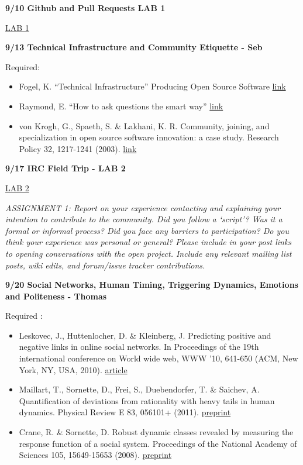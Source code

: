 \textbf{9/10 Github and Pull Requests LAB 1}

\href{http://courses.ischool.berkeley.edu/i290m-ocpp/site/article/lab1.html}{LAB
1}

\textbf{9/13 Technical Infrastructure and Community Etiquette - Seb}

Required:

\begin{itemize}
\itemsep1pt\parskip0pt
\item
  Fogel, K. ``Technical Infrastructure'' Producing Open Source Software
  \href{http://producingoss.com/en/technical-infrastructure.html}{link}
\item
  Raymond, E. ``How to ask questions the smart way''
  \href{http://www.catb.org/esr/faqs/smart-questions.html}{link}
\item
  von Krogh, G., Spaeth, S. \& Lakhani, K. R. Community, joining, and
  specialization in open source software innovation: a case study.
  Research Policy 32, 1217-1241 (2003).
  \href{http://flosshub.org/system/files/rp-vonkroghspaethlakhani.pdf}{link}
\end{itemize}

\textbf{9/17 IRC Field Trip - LAB 2}

\href{http://courses.ischool.berkeley.edu/i290m-ocpp/site/article/lab2.html}{LAB
2}

\emph{ASSIGNMENT 1: Report on your experience contacting and explaining
your intention to contribute to the community. Did you follow a
`script'? Was it a formal or informal process? Did you face any barriers
to participation? Do you think your experience was personal or general?
Please include in your post links to opening conversations with the open
project. Include any relevant mailing list posts, wiki edits, and
forum/issue tracker contributions.}

\textbf{9/20 Social Networks, Human Timing, Triggering Dynamics,
Emotions and Politeness - Thomas}

Required :

\begin{itemize}
\itemsep1pt\parskip0pt
\item
  Leskovec, J., Huttenlocher, D. \& Kleinberg, J. Predicting positive
  and negative links in online social networks. In Proceedings of the
  19th international conference on World wide web, WWW '10, 641-650
  (ACM, New York, NY, USA, 2010).
  \href{http://arxiv.org/abs/1003.2429}{article}
\item
  Maillart, T., Sornette, D., Frei, S., Duebendorfer, T. \& Saichev, A.
  Quantification of deviations from rationality with heavy tails in
  human dynamics. Physical Review E 83, 056101+ (2011).
  \href{http://arxiv.org/abs/1007.4104}{preprint}
\item
  Crane, R. \& Sornette, D. Robust dynamic classes revealed by measuring
  the response function of a social system. Proceedings of the National
  Academy of Sciences 105, 15649-15653 (2008).
  \href{http://arxiv.org/abs/0803.2189}{preprint}
\end{itemize}

